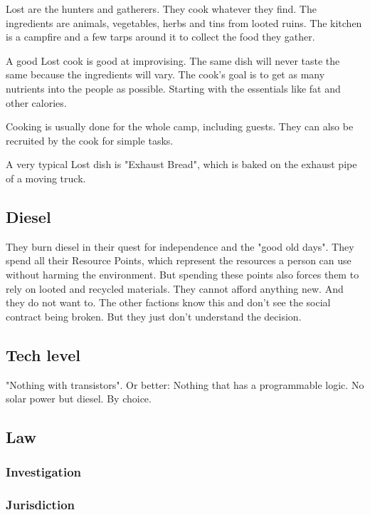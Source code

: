 Lost are the hunters and gatherers. They cook whatever they find. The ingredients are animals, vegetables, herbs and tins from looted ruins. The kitchen is a campfire and a few tarps around it to collect the food they gather.

A good Lost cook is good at improvising. The same dish will never taste the same because the ingredients will vary. The cook's goal is to get as many nutrients into the people as possible. Starting with the essentials like fat and other calories.

Cooking is usually done for the whole camp, including guests. They can also be recruited by the cook for simple tasks.

A very typical Lost dish is "Exhaust Bread", which is baked on the exhaust pipe of a moving truck.

\subsection{Diesel}

They burn diesel in their quest for independence and the "good old days". They spend all their Resource Points, which represent the resources a person can use without harming the environment. But spending these points also forces them to rely on looted and recycled materials. They cannot afford anything new. And they do not want to.
The other factions know this and don't see the social contract being broken. But they just don't understand the decision.

\subsection{Tech level}

"Nothing with transistors". Or better: Nothing that has a programmable logic. No solar power but diesel. By choice.

\subsection{Law}
\label{sec: lost law}

\subsubsection{Investigation}


\subsubsection{Jurisdiction}

